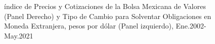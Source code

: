 \documentclass[
  a4paper,
]{article}
\begin{document}
\begin{figure}

\caption{\label{fig-fig3}índice de Precios y Cotizaciones de la Bolsa
Mexicana de Valores (Panel Derecho) y Tipo de Cambio para Solventar
Obligaciones en Moneda Extranjera, pesos por dólar (Panel izquierdo),
Ene.2002-May.2021}

\begin{minipage}{0.50\linewidth}



\end{minipage}%
%
\begin{minipage}{0.50\linewidth}



\end{minipage}%

\end{figure}%
\end{document}
